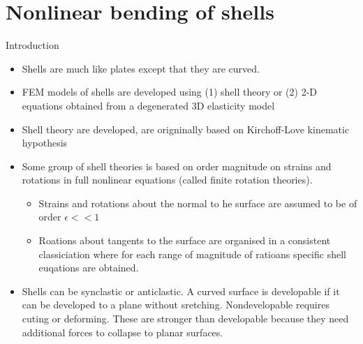 




	\tableofcontents

\section{Nonlinear bending of shells}

	
	\begin{frame}{Introduction}
		\begin{itemize}
			\item Shells are much like plates except that they are curved. 
			\item FEM models of shells are developed using (1) shell theory or (2) 2-D equations obtained from a degenerated 3D elasticity model 
			\item Shell theory are developed, are origninally based on Kirchoff-Love kinematic hypothesis
			\item Some group of shell theories is based on order magnitude on strains and rotations in full nonlinear equations (called finite rotation theories). 
			\begin{itemize}
				\item Strains and rotations about the normal to he surface are assumed to be of order $\epsilon<<1$
				\item Roations about tangents to the surface are organised in a consistent classiciation where for each range of magnitude of ratioans specific shell euqations are obtained. 
			\end{itemize}
		\item Shells can be synclastic or anticlastic. A curved surface is developable if it can be developed to a plane without sretching. Nondevelopable requires cuting or deforming. These are stronger than developable because they need additional forces to collapse to planar surfaces. 
		\end{itemize}
	\end{frame}


